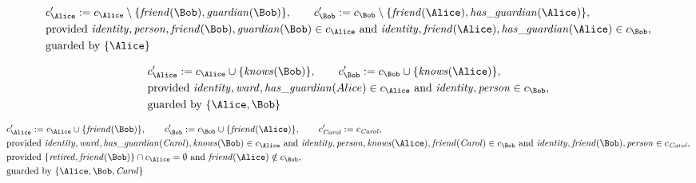 \begin{align*}
&
c'_
{
\Alice
}
 := 
c_
{
\Alice
}
 \setminus 
\{
\mathit{\detokenize{
friend
}}
(
\Bob
)
,
\mathit{\detokenize{
guardian
}}
(
\Bob
)
\}
, \qquad 
c'_
{
\Bob
}
 := 
c_
{
\Bob
}
 \setminus 
\{
\mathit{\detokenize{
friend
}}
(
\Alice
)
,
\mathit{\detokenize{
has_guardian
}}
(
\Alice
)
\}
,\\
&
\text{provided } 
\mathit{\detokenize{
identity
}}
,
\mathit{\detokenize{
person
}}
,
\mathit{\detokenize{
friend
}}
(
\Bob
)
,
\mathit{\detokenize{
guardian
}}
(
\Bob
)
 \in c_
{
\Alice
}
 \text{ and } 
\mathit{\detokenize{
identity
}}
,
\mathit{\detokenize{
friend
}}
(
\Alice
)
,
\mathit{\detokenize{
has_guardian
}}
(
\Alice
)
 \in c_
{
\Bob
}
,\\
&
\text{guarded by } \{
\Alice
\}
\end{align*}

\begin{align*}
&
c'_
{
\Alice
}
 := 
c_
{
\Alice
}
 \cup 
\{
\mathit{\detokenize{
knows
}}
(
\Bob
)
\}
, \qquad 
c'_
{
\Bob
}
 := 
c_
{
\Bob
}
 \cup 
\{
\mathit{\detokenize{
knows
}}
(
\Alice
)
\}
,\\
&
\text{provided } 
\mathit{\detokenize{
identity
}}
,
\mathit{\detokenize{
ward
}}
,
\mathit{\detokenize{
has_guardian
}}
(
Alice
)
 \in c_
{
\Alice
}
 \text{ and } 
\mathit{\detokenize{
identity
}}
,
\mathit{\detokenize{
person
}}
 \in c_
{
\Bob
}
,\\
&
\text{guarded by } \{
\Alice
,
\Bob
\}
\end{align*}

\begin{align*}
&
c'_
{
\Alice
}
 := 
c_
{
\Alice
}
 \cup 
\{
\mathit{\detokenize{
friend
}}
(
\Bob
)
\}
, \qquad 
c'_
{
\Bob
}
 := 
c_
{
\Bob
}
 \cup 
\{
\mathit{\detokenize{
friend
}}
(
\Alice
)
\}
, \qquad 
c'_
{
\mathit{Carol}
}
 := 
c_
{
\mathit{Carol}
}
,\\
&
\text{provided } 
\mathit{\detokenize{
identity
}}
,
\mathit{\detokenize{
ward
}}
,
\mathit{\detokenize{
has_guardian
}}
(
\mathit{Carol}
)
,
\mathit{\detokenize{
knows
}}
(
\Bob
)
 \in c_
{
\Alice
}
 \text{ and } 
\mathit{\detokenize{
identity
}}
,
\mathit{\detokenize{
person
}}
,
\mathit{\detokenize{
knows
}}
(
\Alice
)
,
\mathit{\detokenize{
friend
}}
(
\mathit{Carol}
)
 \in c_
{
\Bob
}
 \text{ and } 
\mathit{\detokenize{
identity
}}
,
\mathit{\detokenize{
friend
}}
(
\Bob
)
,
\mathit{\detokenize{
person
}}
 \in c_
{
\mathit{Carol}
}
,\\
&
\text{provided } 
\{
\mathit{\detokenize{
retired
}}
,
\mathit{\detokenize{
friend
}}
(
\Bob
)
\}
 \cap c_
{
\Alice
}
 = \emptyset
 \text{ and } 
\mathit{\detokenize{
friend
}}
(
\Alice
)
 \notin c_
{
\Bob
}
,\\
&
\text{guarded by } \{
\Alice
,
\Bob
,
\mathit{Carol}
\}
\end{align*}
